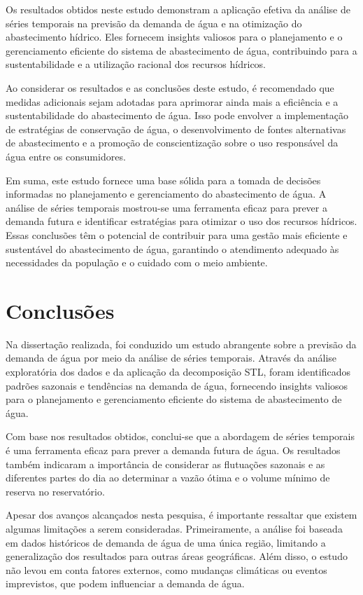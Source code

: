 Os resultados obtidos neste estudo demonstram a aplicação efetiva da análise de séries temporais na previsão da demanda de água e na otimização do abastecimento hídrico. Eles fornecem insights valiosos para o planejamento e o gerenciamento eficiente do sistema de abastecimento de água, contribuindo para a sustentabilidade e a utilização racional dos recursos hídricos.

Ao considerar os resultados e as conclusões deste estudo, é recomendado que medidas adicionais sejam adotadas para aprimorar ainda mais a eficiência e a sustentabilidade do abastecimento de água. Isso pode envolver a implementação de estratégias de conservação de água, o desenvolvimento de fontes alternativas de abastecimento e a promoção de conscientização sobre o uso responsável da água entre os consumidores.

Em suma, este estudo fornece uma base sólida para a tomada de decisões informadas no planejamento e gerenciamento do abastecimento de água. A análise de séries temporais mostrou-se uma ferramenta eficaz para prever a demanda futura e identificar estratégias para otimizar o uso dos recursos hídricos. Essas conclusões têm o potencial de contribuir para uma gestão mais eficiente e sustentável do abastecimento de água, garantindo o atendimento adequado às necessidades da população e o cuidado com o meio ambiente.


\section{Conclus\~oes} \label{sec:conclusoes}

Na dissertação realizada, foi conduzido um estudo abrangente sobre a previsão da demanda de água por meio da análise de séries temporais. Através da análise exploratória dos dados e da aplicação da decomposição STL, foram identificados padrões sazonais e tendências na demanda de água, fornecendo insights valiosos para o planejamento e gerenciamento eficiente do sistema de abastecimento de água.

Com base nos resultados obtidos, conclui-se que a abordagem de séries temporais é uma ferramenta eficaz para prever a demanda futura de água. Os resultados também indicaram a importância de considerar as flutuações sazonais e as diferentes partes do dia ao determinar a vazão ótima e o volume mínimo de reserva no reservatório.

Apesar dos avanços alcançados nesta pesquisa, é importante ressaltar que existem algumas limitações a serem consideradas. Primeiramente, a análise foi baseada em dados históricos de demanda de água de uma única região, limitando a generalização dos resultados para outras áreas geográficas. Além disso, o estudo não levou em conta fatores externos, como mudanças climáticas ou eventos imprevistos, que podem influenciar a demanda de água.

